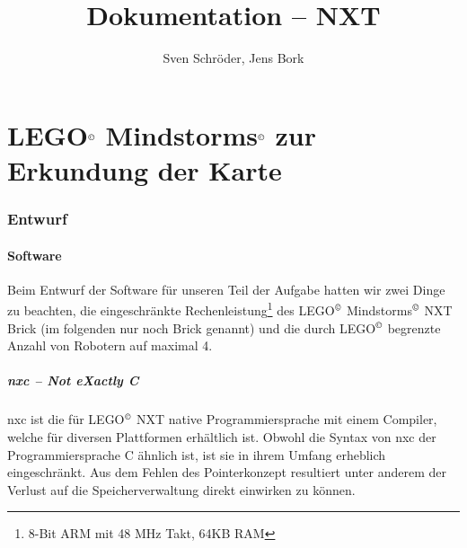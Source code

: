 \documentclass[10pt,a4paper]{scrartcl}
\author{Sven Schröder, Jens Bork}
\title{Dokumentation -- NXT}
\begin{document}
\maketitle
\tableofcontents
\part{LEGO$^\copyright$ Mindstorms$^\copyright$ zur Erkundung der Karte}
\section{Entwurf}
\subsection{Software}
Beim Entwurf der Software für unseren Teil der Aufgabe hatten wir zwei Dinge zu beachten, die eingeschränkte Rechenleistung\footnote{8-Bit ARM mit 48 MHz Takt, 64KB RAM} des LEGO$^\copyright$ Mindstorms$^\copyright$ NXT Brick (im folgenden nur noch Brick genannt) und die durch LEGO$^\copyright$ begrenzte Anzahl von Robotern auf maximal 4. 
\subsubsection{nxc -- Not eXactly C}
nxc ist die für LEGO$^\copyright$ NXT native Programmiersprache mit einem Compiler, welche für diversen Plattformen erhältlich ist. Obwohl die Syntax von nxc der Programmiersprache C ähnlich ist, ist sie in ihrem Umfang erheblich eingeschränkt. Aus dem Fehlen des Pointerkonzept resultiert unter anderem der Verlust auf die Speicherverwaltung direkt einwirken zu können.
\end{document}
